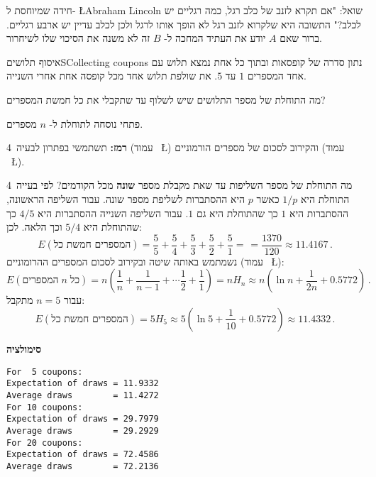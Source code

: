 
חידה שמיוחסת ל-%
\L{Abraham Lincoln}
שואל: "אם תקרא לזנב של כלב רגל, כמה רגליים יש לכלב?" התשובה היא שלקרוא לזנב רגל לא הופך אותו לרגל ולכן לכלב עדיין יש ארבע רגליים. ברור שאם
$A$
יודע את העתיד המחכה ל-%
$B$
זה לא משנה את הסיכוי שלו לשיחרור.


\begin{prob}{איסוף תלושים}{S}{Collecting coupons}
נתון סדרה של קופסאות ובתוך כל אחת נמצא תלוש עם אחד המספרים 
$1$
עד
$5$.
את שולפת תלוש אחד מכל קופסה אחת אחרי השנייה.

מה התוחלת של מספר התלושים שיש לשלוף עד שתקבלי את כל חמשת המספרים?

פתחי נוסחה לתוחלת ל-%
$n$
מספרים.

\textbf{רמז:}
תשתמשי בפתרון לבעיה~4 (עמוד%
~\L{\pageref{p.four}})
והקירוב לסכום של מספרים הורמוניים 
(עמוד%
~\L{\pageref{p.harmonic})}.
\end{prob}

\solution{}

מה התוחלת של מספר השליפות עד שאת מקבלת מספר
\textbf{שונה}
מכל הקודמים? לפי בעייה~4 התוחלת היא
$1/p$
כאשר 
$p$
היא ההסתברות לשליפת מספר שונה. עבור השליפה הראשונה, ההסתברות היא 
$1$
כך שהתוחלת היא גם
$1$.
עבור השליפה השנייה ההסתברות היא 
$4/5$
כך שהתוחלת היא 
$5/4$
וכך הלאה. לכן:
\[
E(\textrm{המספרים חמשת כל}) = \frac{5}{5}+\frac{5}{4} + \frac{5}{3} + \frac{5}{2} + \frac{5}{1} = \frac{}{} =\frac{1370}{120}\approx 11.4167\,.
\]
נשמתמש באותה שיטה ובקירוב לסכום המספרים ההרומוניים (עמוד%
~\L{\pageref{p.harmonic}}):
\[
E(\textrm{המספרים}\;n \;\textrm{כל}) = n\left(\frac{1}{n}+\frac{1}{n-1} + \cdots \frac{1}{2} + \frac{1}{1}\right) =nH_n\approx n\left(\ln n + \frac{1}{2n} + 0.5772\right)\,. 
\]
עבור
$n=5$
מתקבל:
\[
E(\textrm{המספרים חמשת כל}) =5H_5\approx 5(\ln 5 + \frac{1}{10} + 0.5772) \approx 11.4332\,.
\]

\textbf{סימולציה}
\begin{verbatim}
For  5 coupons:
Expectation of draws = 11.9332
Average draws        = 11.4272
For 10 coupons:
Expectation of draws = 29.7979
Average draws        = 29.2929
For 20 coupons:
Expectation of draws = 72.4586
Average draws        = 72.2136
\end{verbatim}


